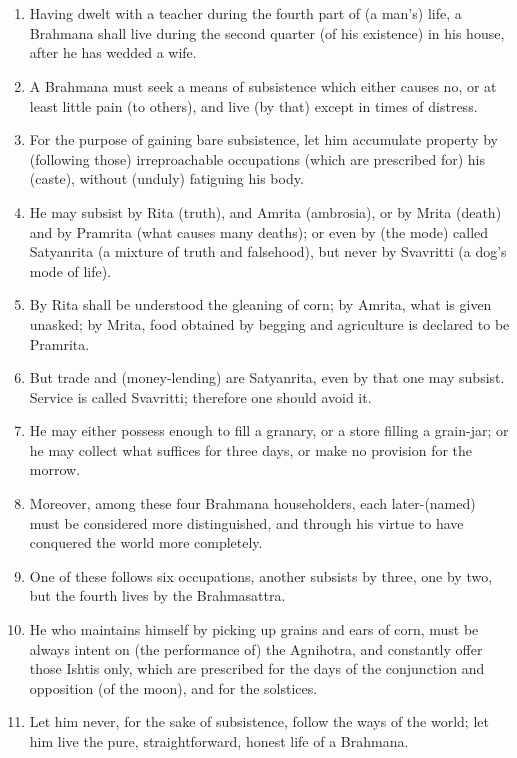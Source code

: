 \chapter{}
\begin{enumerate}
\item Having dwelt with a teacher during the fourth part of (a man's) life, a Brahmana shall live during the second quarter (of his existence) in his house, after he has wedded a wife.
\item A Brahmana must seek a means of subsistence which either causes no, or at least little pain (to others), and live (by that) except in times of distress.
\item For the purpose of gaining bare subsistence, let him accumulate property by (following those) irreproachable occupations (which are prescribed for) his (caste), without (unduly) fatiguing his body.
\item He may subsist by Rita (truth), and Amrita (ambrosia), or by Mrita (death) and by Pramrita (what causes many deaths); or even by (the mode) called Satyanrita (a mixture of truth and falsehood), but never by Svavritti (a dog's mode of life).
\item By Rita shall be understood the gleaning of corn; by Amrita, what is given unasked; by Mrita, food obtained by begging and agriculture is declared to be Pramrita.
\item But trade and (money-lending) are Satyanrita, even by that one may subsist. Service is called Svavritti; therefore one should avoid it.
\item He may either possess enough to fill a granary, or a store filling a grain-jar; or he may collect what suffices for three days, or make no provision for the morrow.
\item Moreover, among these four Brahmana householders, each later-(named) must be considered more distinguished, and through his virtue to have conquered the world more completely.
\item One of these follows six occupations, another subsists by three, one by two, but the fourth lives by the Brahmasattra.
\item He who maintains himself by picking up grains and ears of corn, must be always intent on (the performance of) the Agnihotra, and constantly offer those Ishtis only, which are prescribed for the days of the conjunction and opposition (of the moon), and for the solstices.
\item Let him never, for the sake of subsistence, follow the ways of the world; let him live the pure, straightforward, honest life of a Brahmana.

\end{enumerate}
